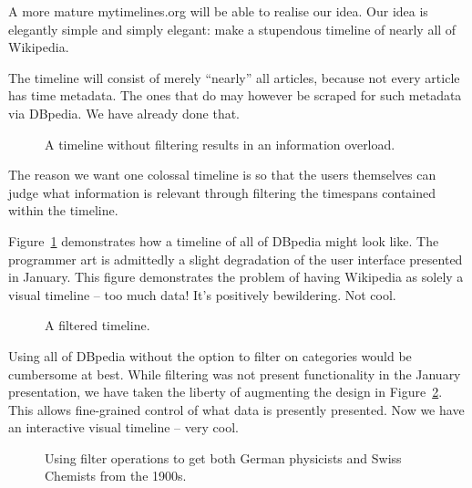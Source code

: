 A more mature mytimelines.org will be able to realise our idea. Our idea is 
elegantly simple and simply elegant: make a stupendous timeline of nearly all 
of Wikipedia.

The timeline will consist of merely ``nearly'' all articles, because not every 
article has time metadata. The ones that do may however be scraped for such 
metadata via DBpedia. We have already done that.

\begin{figure}[H]
  \centering
  \begin{scale}{0.3}
    
  \end{scale}
  \caption{A timeline without filtering results in an information overload.}
  \label{fig:overload}
\end{figure}

The reason we want one colossal timeline is so that the users themselves can 
judge what information is relevant through filtering the timespans contained 
within the timeline.

Figure~\ref{fig:overload} demonstrates how a timeline of all of DBpedia might 
look like. The programmer art is admittedly a slight degradation of the user 
interface presented in January. This figure demonstrates the problem of having 
Wikipedia as solely a visual timeline -- too much data! It's positively 
bewildering. Not cool.

\begin{figure}[H]
  \centering
  \begin{scale}{0.3}
    
  \end{scale}
  \caption{A filtered timeline.}
  \label{fig:filtered}
\end{figure}

Using all of DBpedia without the option to filter on categories would be
cumbersome at best. While filtering was not present functionality in the
January presentation, we have taken the liberty of augmenting the design in
Figure~\ref{fig:filtered}. This allows fine-grained control of what data is
presently presented. Now we have an interactive visual timeline -- very cool.

\begin{figure}[H]
  \centering
  \begin{scale}{0.5}
    
  \end{scale}
  \caption{Using filter operations to get both German physicists and Swiss Chemists from the 1900s.}
  \label{fig:filteropss}
\end{figure}

